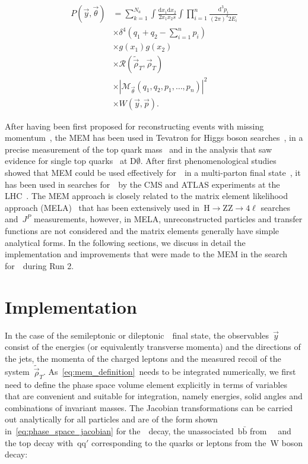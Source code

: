 \begin{align}
\label{eq:mem_definition}
P(\vec{y}, \vec{\theta}) &= \sum_{k=1}^{N_a} \int \frac{\mathrm{d}x_1 \mathrm{d}x_2}{2 x_1 x_2 s} \int \prod_{i=1}^{n} \frac{\mathrm{d}^3 p_i}{(2\pi)^3 2 E_i} \\
&\times \delta^4 (q_1 + q_2 - \sum_{i=1}^n p_i)\\
&\times g(x_1) g(x_2) \\ 
&\times \mathcal{R}(\tilde{\vec{\rho}}_T, \vec{\rho}_T) \\ 
&\times |\mathcal{M}_{\vec{\theta}}(q_1, q_2, p_1, \dots, p_n)|^2 \\
&\times W(\vec{y}, \vec{p}).
\end{align}

After having been first proposed for reconstructing events with missing momentum~\cite{Kondo:1988yd}, the MEM has been used in Tevatron for Higgs boson searches~\cite{Aaltonen:2009dh,Aaltonen:2011rt}, in a precise measurement of the top quark mass~\cite{D0topmass2004} and in the analysis that saw evidence for single top quarks~\cite{Abazov:2008kt} at $\mathrm{D}\emptyset$. After first phenomenological studies showed that MEM could be used effectively for~\ttH~in a multi-parton final state~\cite{Artoisenet:2013vfa}, it has been used in searches for~\ttHbb~by the CMS and ATLAS experiments at the LHC~\cite{Aad:2015gra,Khachatryan:2015ila}. The MEM approach is closely related to the matrix element likelihood approach (MELA)~\cite{Gao:2010qx} that has been extensively used in~$\mathrm{H} \rightarrow \mathrm{ZZ} \rightarrow 4\mathrm{\ell}$ searches and~$J^P$ measurements, however, in MELA, unreconstructed particles and transfer functions are not considered and the matrix elements generally have simple analytical forms.
In the following sections, we discuss in detail the implementation and improvements that were made to the MEM in the search for~\ttHbb~during Run 2.

\section{Implementation}
\label{sec:mem_implementation}
In the case of the semileptonic or dileptonic~\ttH~final state, the observables~$\vec{y}$ consist of the energies (or equivalently transverse momenta) and the directions of the jets, the momenta of the charged leptons and the measured recoil of the system~$\tilde{\vec{\rho}}_T$. As~\cref{eq:mem_definition}~needs to be integrated numerically, we first need to define the phase space volume element explicitly in terms of variables that are convenient and suitable for integration, namely energies, solid angles and combinations of invariant masses. The Jacobian transformations can be carried out analytically for all particles and are of the form shown in~\cref{eq:phase_space_jacobian} for the~\Hbb~decay, the unassociated~$\mathrm{b}\bar{\mathrm{b}}$ from~\ttbb~ and the top decay with~$\mathrm{qq'}$ corresponding to the quarks or leptons from the~$\mathrm{W}$ boson decay:

